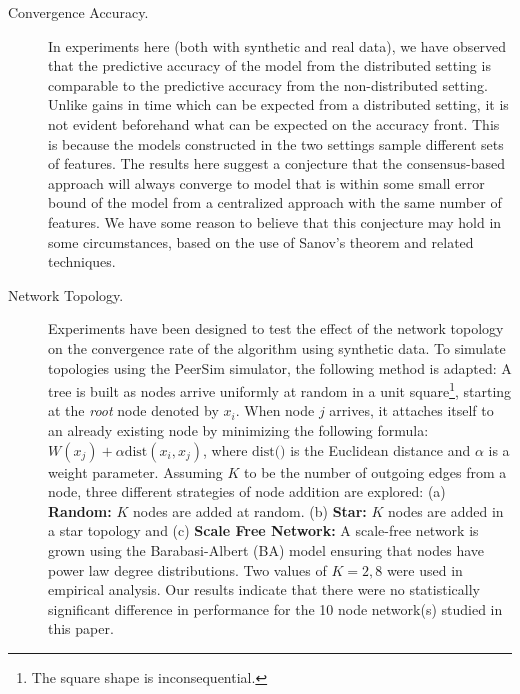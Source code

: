 \begin{description}
    \item[Convergence Accuracy.] In experiments here (both with synthetic and real data), we have observed that
            the predictive accuracy of the model from the distributed setting is comparable to the predictive accuracy from
            the non-distributed setting. Unlike gains in time which can be expected from a distributed setting,
            it is not evident beforehand
            what can be expected on the accuracy front. This is because the models constructed in the two settings sample different
            sets of features. The results here suggest a conjecture that the consensus-based approach will always converge
            to model that is within some small error bound of the model from a centralized approach with the
            same number of features. We have some reason to believe that this conjecture may hold
            in some circumstances, based on the use of Sanov's theorem \cite{Sanov_57} and related techniques.
 \item[Network Topology.] Experiments have been designed to test the effect of the network topology on the convergence rate of the algorithm using synthetic data.  To simulate topologies using the PeerSim simulator, the following method is adapted: A tree is built as nodes arrive uniformly at random in a unit
square\footnote{The square shape is inconsequential.}, starting at the \emph{root} node denoted by $x_i$. When node $j$ arrives,
it attaches itself to an already existing node by minimizing the following formula: $W(x_j) + \alpha \text{dist}(x_i, x_j)$, where $\text{dist()}$ is the Euclidean distance and $\alpha$ is a weight parameter. Assuming $K$ to be the number of outgoing edges from a node, three different strategies of node addition are explored: (a) \textbf{Random: } $K$ nodes are added at random. (b)  \textbf{Star: } $K$ nodes are added in a star topology and (c) \textbf{Scale Free Network: } A scale-free network is grown using the Barabasi-Albert (BA) model ensuring that nodes have power law degree distributions. Two values of $K = 2, 8$ were used in empirical analysis. Our results indicate that there were no statistically significant difference in performance for the 10 node network(s) studied in this paper.


\end{description}


